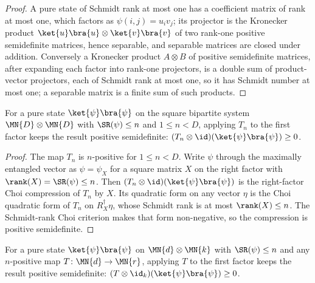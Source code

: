 \begin{proof}
    \leanok
    A pure state of Schmidt rank at most one has a coefficient matrix of rank at most
    one, which factors as $\psi(i,j)=u_i v_j$; its projector is the Kronecker product
    $\ket{u}\bra{u}\otimes\ket{v}\bra{v}$ of two rank-one positive semidefinite
    matrices, hence separable, and separable matrices are closed under addition.
    Conversely a Kronecker product $A\otimes B$ of positive semidefinite matrices,
    after expanding each factor into rank-one projectors, is a double sum of
    product-vector projectors, each of Schmidt rank at most one, so it has Schmidt
    number at most one; a separable matrix is a finite sum of such products.
\end{proof}

\begin{theorem}
    \label{thm:tensor_map_id_t_eta_posSemidef_pure}
    \leanok
    For a pure state $\ket{\psi}\bra{\psi}$ on the square bipartite system
    $\MN{D}\otimes\MN{D}$ with $\SR(\psi)\le n$ and
    $1\le n<D$, applying $T_n$ to the first factor keeps the result positive
    semidefinite: $(T_n\otimes\id)(\ket{\psi}\bra{\psi})\ge 0$.
\end{theorem}

\begin{proof}
    \leanok
    The map $T_n$ is $n$-positive for $1\le n<D$. Write $\psi$ through the maximally
    entangled vector as $\psi=\psi_X$ for a square matrix $X$ on the right factor with
    $\rank(X)=\SR(\psi)\le n$. Then
    $(T_n\otimes\id)(\ket{\psi}\bra{\psi})$ is the right-factor Choi compression of
    $T_n$ by $X$. Its quadratic form on any vector $\eta$ is the Choi quadratic form
    of $T_n$ on $R_X^\dagger\eta$, whose Schmidt rank is at most
    $\rank(X)\le n$. The Schmidt-rank Choi criterion makes that form
    non-negative, so the compression is positive semidefinite.
\end{proof}

\begin{theorem}
    \label{thm:tensor_map_id_posSemidef_pure}
    \leanok
    For a pure state $\ket{\psi}\bra{\psi}$ on
    $\MN{d}\otimes\MN{k}$ with $\SR(\psi)\le n$ and any $n$-positive map
    $T\colon\MN{d}\to\MN{r}$, applying $T$ to the first factor keeps the result
    positive semidefinite:
    $(T\otimes\id_k)(\ket{\psi}\bra{\psi})\ge 0$.
\end{theorem}

